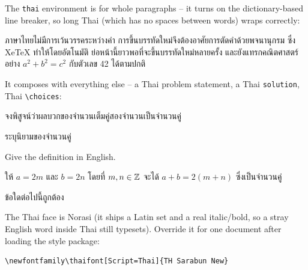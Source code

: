 \documentclass[a4paper, 10pt]{article}
\begin{document}
The \verb|thai| environment is for whole paragraphs -- it turns on the
dictionary-based line breaker, so long Thai (which has no spaces between words)
wraps correctly:
\begin{thai}
	ภาษาไทยไม่มีการเว้นวรรคระหว่างคำ การขึ้นบรรทัดใหม่จึงต้องอาศัยการตัดคำด้วยพจนานุกรม
	ซึ่ง XeTeX ทำให้โดยอัตโนมัติ ย่อหน้านี้ยาวพอที่จะขึ้นบรรทัดใหม่หลายครั้ง
	และยังแทรกคณิตศาสตร์อย่าง \(a^2 + b^2 = c^2\) กับตัวเลข 42 ได้ตามปกติ
\end{thai}

It composes with everything else -- a Thai problem statement, a Thai
\verb|solution|, Thai \verb|\choices|:
\begin{problem}
\textthai{จงพิสูจน์ว่าผลบวกของจำนวนเต็มคู่สองจำนวนเป็นจำนวนคู่}
\begin{subproblems}
	\item \textthai{ระบุนิยามของจำนวนคู่}
	\item Give the definition in English.
\end{subproblems}
\end{problem}
\begin{solution}
	\begin{thai}
		ให้ \(a = 2m\) และ \(b = 2n\) โดยที่ \(m, n \in \mathbb{Z}\) จะได้
		\(a + b = 2(m + n)\) ซึ่งเป็นจำนวนคู่
	\end{thai}
\end{solution}
\begin{problem}
\textthai{ข้อใดต่อไปนี้ถูกต้อง}
\begin{subproblems}
	\item {}
\end{subproblems}
\end{problem}

The Thai face is Norasi (it ships a Latin set and a real italic/bold, so a
stray English word inside Thai still typesets). Override it for one document
after loading the style package:
\begin{verbatim}
\newfontfamily\thaifont[Script=Thai]{TH Sarabun New}
\end{verbatim}

\end{document}
